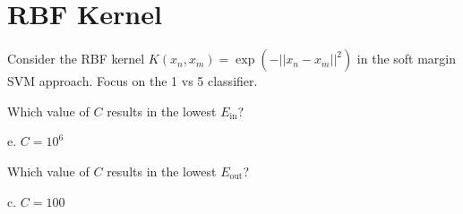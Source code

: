 \documentclass[answers]{exam}
\begin{document}
\section*{RBF Kernel}

Consider the RBF kernel $K(x_n, x_m) = \exp(-||x_n - x_m||^2)$ in the soft
margin SVM approach. Focus on the 1 vs 5 classifier.

\begin{questions}
\setcounter{question}{8}
\question Which value of \(C\) results in the lowest \(E_{\text{in}}\)?

\begin{solution}
e. \(C = 10^6\)
\end{solution}

\question Which value of \(C\) results in the lowest \(E_{\text{out}}\)?

\begin{solution}
c. \(C = 100\)
\end{solution}
\end{questions}
\end{document}
